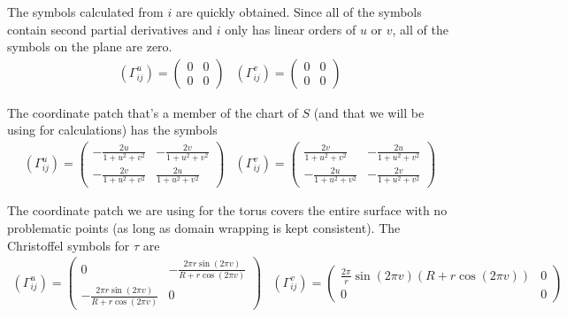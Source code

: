 \documentclass{article}
\begin{document}
		The symbols calculated from $i$ are quickly obtained.
		Since all of the symbols contain second partial derivatives and $i$ only has linear orders of $u$ or $v$, all of the symbols on the plane are zero.
		\begin{equation}
			\begin{array}{lr}
				\left(\Gamma^{u}_{ij}\right) = \left( \begin{array}{cc}
					0 & 0 \\
					0 & 0
				\end{array} \right) &
				\left(\Gamma^{v}_{ij}\right) = \left( \begin{array}{cc}
					0 & 0 \\
					0 & 0
				\end{array} \right)
			\end{array}
		\end{equation}
		
		The coordinate patch that's a member of the chart of $S$ (and that we will be using for calculations) has the symbols
		\begin{equation}
			\begin{array}{lr}
			\left(\Gamma^{u}_{ij}\right) = \left( \begin{array}{cc}
					-\frac{2u}{1+u^2+v^2} & -\frac{2v}{1+u^2+v^2} \\
					-\frac{2v}{1+u^2+v^2} & \frac{2u}{1+u^2+v^2}
				\end{array} \right) &
			\left(\Gamma^{v}_{ij}\right) = \left( \begin{array}{cc}
					\frac{2v}{1+u^2+v^2} & -\frac{2u}{1+u^2+v^2} \\
					-\frac{2u}{1+u^2+v^2} & -\frac{2v}{1+u^2+v^2}
				\end{array} \right)
			\end{array}
		\end{equation}
		
		The coordinate patch we are using for the torus covers the entire surface with no problematic points (as long as domain wrapping is kept consistent).
		The Christoffel symbols for $\tau$ are
		\begin{equation}
			\begin{array}{lr}
				\left(\Gamma^{u}_{ij}\right) = \left( \begin{array}{cc}
					0 & -\frac{2\pi r\sin(2\pi v)}{R+r\cos(2\pi v)} \\
					-\frac{2\pi r\sin(2\pi v)}{R+r\cos(2\pi v)} & 0
				\end{array} \right) &
				\left(\Gamma^{v}_{ij}\right) = \left( \begin{array}{cc}
					\frac{2\pi}{r}\sin(2\pi v)(R+r\cos(2\pi v)) & 0 \\
					0 & 0
				\end{array} \right)
			\end{array}
		\end{equation}
	
\end{document}
